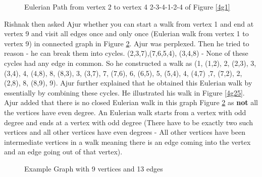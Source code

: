 \begin{figure}
\begin{center}
\caption{ Eulerian Path from vertex 2 to vertex 4 2-3-4-1-2-4 of Figure \ref{4g1}}\label{4g15}
\end{center}
\end{figure}
\vspace{2cm}
Rishnak then asked Ajur whether you can start a walk from vertex 1 and end at vertex 9 and visit all edges once and only once (Eulerian walk from vertex 1 to vertex 9) in connected graph in Figure \ref{4g2}.
Ajur was perplexed. Then he tried to reason - he can break them into cycles. (2,3,7),(7,6,5,4), (3,4,8)  - None of these cycles had any edge in common. So he constructed a walk as (1, (1,2), 2, (2,3),
3, (3,4), 4, (4,8), 8, (8,3), 3, (3,7), 7, (7,6), 6, (6,5), 5, (5,4), 4, (4,7) ,7,
(7,2), 2, (2,8), 8, (8,9), 9). Ajur further explained that he obtained this Eulerian walk by essentially by combining these cycles. He illustrated his walk in Figure \ref{4g25}. Ajur added that there is no closed Eulerian walk in this graph Figure \ref{4g2} as \textbf{not} all the vertices have even degree. An Eulerian walk starts from a vertex with odd degree and ends at a vertex with odd degree (There have to be exactly two such vertices and all other vertices have even degrees - All other vertices have been intermediate vertices in a walk meaning there is an edge coming into the vertex and an edge going out of that vertex).

\begin{figure}
\begin{center}
\caption{ Example Graph with 9 vertices and 13 edges}\label{4g2}
\end{center}
\end{figure}

